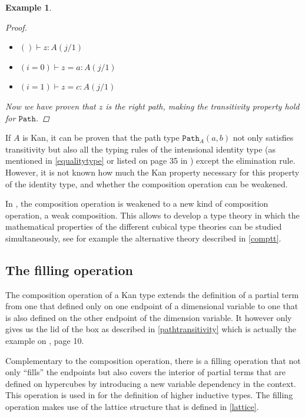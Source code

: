 \documentclass[12pt,a4paper,twoside,xetex]{book}
\newtheorem{example}[theorem]{Example}
\newcommand{\op}[1]{\mathtt{#1}}
\begin{document}
\begin{example}
\begin{proof}
\begin{itemize}
\item $ () \vdash z: A(j/1)$
\item $ (i = 0) \vdash z = a : A(j/1)$
\item $ (i = 1) \vdash z = c : A(j/1)$
\end{itemize}

Now we have proven that $z$ is the right path, making the transitivity property hold for $\op{Path}$. 

\end{proof} 

\end{example}

If $A$ is Kan, it can be proven that the path type $\op{Path}_A(a,b)$ not only  satisfies transitivity but also all the typing rules of  the intensional identity type (as mentioned in \cref{equalitytype} or listed on page 35 in \cite{Orton2019}) except the elimination rule. However, it is not known how much the Kan property necessary for this property of the identity type, and whether the composition operation can be weakened. 

In \cite{Cavallo2019}, the composition operation is weakened to a new kind of composition operation, a weak composition. This allows to develop a type theory in which the mathematical properties of the different cubical type theories can be studied simultaneously, see for example the alternative theory described in \cref{comptt}.


\subsection{The filling operation}\label{filling}

The composition operation of a Kan type extends the definition of a partial term from one that defined only on one  endpoint  of a dimensional variable to one that is also defined on the other endpoint of the dimension variable. It however only gives us the lid of the box as described in \cref{pathtransitivity} which is actually the example  on \cite{Coquand2018}, page 10. 

Complementary to the composition operation, there is a filling operation that not only ``fills'' the endpoints but also covers the interior of partial terms that are defined on hypercubes by introducing a new variable dependency in the context. This operation is used in \cite{Coquand2018} for the definition of higher inductive types. The filling operation makes use of the lattice structure that is defined in \cref{lattice}. 
\end{document}
